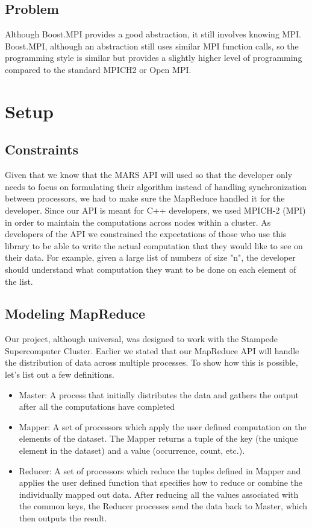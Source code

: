 \documentclass[11pt]{article}
\begin{document}
\subsection{Problem}
Although Boost.MPI provides a good abstraction, it still involves knowing MPI. Boost.MPI, although an abstraction still uses similar MPI function calls, so the programming style is similar but provides a slightly higher level of programming compared to the standard MPICH2 or Open MPI.

\section{Setup}
\subsection{Constraints}
Given that we know that the MARS API will used so that the developer only needs to focus on formulating their algorithm instead of handling synchronization between processors, we had to make sure the MapReduce handled it for the developer. Since our API is meant for C++ developers, we used MPICH-2 (MPI) in order to maintain the computations across nodes within a cluster. As developers of the API we constrained the expectations of those who use this library to be able to write the actual computation that they would like to see on their data. For example, given a large list of numbers of size "n", the developer should understand what computation they want to be done on each element of the list. 
\subsection{Modeling MapReduce}
Our project, although universal, was designed to work with the Stampede Supercomputer Cluster. Earlier we stated that our MapReduce API will handle the distribution of data across multiple processes. To show how this is possible, let's list out a few definitions.
\begin{itemize}
  \item Master: A process that initially distributes the data and gathers the output after all the computations have completed
  \item Mapper: A set of processors which apply the user defined computation on the elements of the dataset. The Mapper returns a tuple of the key (the unique element in the dataset) and a value (occurrence, count, etc.).
  \item Reducer: A set of processors which reduce the tuples defined in Mapper and applies the user defined function that specifies how to reduce or combine the individually mapped out data. After reducing all the values associated with the common keys, the Reducer processes send the data back to Master, which then outputs the result.
\end{itemize}
\end{document}
